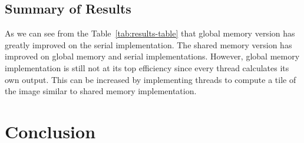 \subsection{Summary of Results}
As we can see from the Table~\ref{tab:results-table} that global memory version has greatly improved on the serial implementation. The shared memory version has improved on global memory and serial implementations. However, global memory implementation is still not at its top efficiency since every thread calculates its own output. This can be increased by implementing threads to compute a tile of the image similar to shared memory implementation. 

\section{Conclusion} 


\newpage



 

